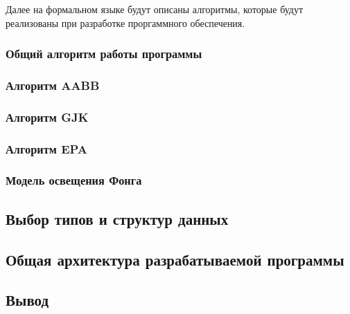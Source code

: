 Далее на формальном языке будут описаны алгоритмы, которые будут реализованы при разработке проргаммного обеспечения.

\subsubsection{Общий алгоритм работы программы}


\subsubsection{Алгоритм AABB}

\subsubsection{Алгоритм GJK}

\subsubsection{Алгоритм EPA}

\subsubsection{Модель освещения Фонга}

\subsection{Выбор типов и структур данных}

\subsection{Общая архитектура разрабатываемой программы}


\subsection*{Вывод}


